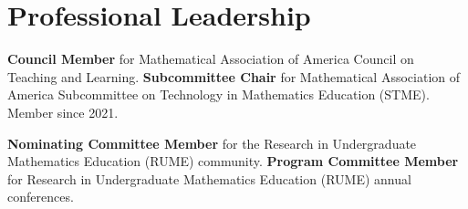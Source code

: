 \documentclass[10pt,a4paper,sans]{moderncv}
\begin{document}
	
	
	
	
	\section{Professional Leadership}
	{\textbf{Council Member} for Mathematical Association of America Council on Teaching and Learning.}
	{\textbf{Subcommittee Chair} for Mathematical Association of America Subcommittee on Technology in Mathematics Education (STME). Member since 2021.}
	
	{\textbf{Nominating Committee Member} for the Research in Undergraduate Mathematics Education (RUME) community.}	
	{\textbf{Program Committee Member} for Research in Undergraduate Mathematics Education (RUME) annual conferences.}
	
\end{document}
